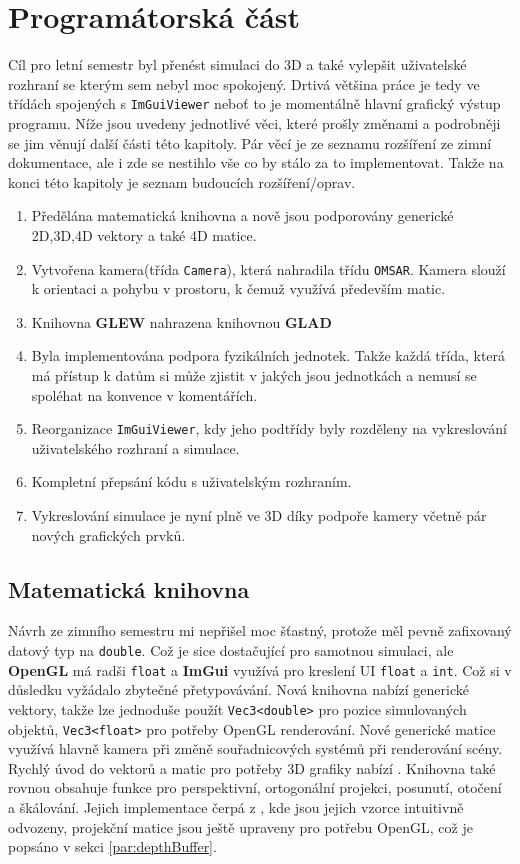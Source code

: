 
\chapter{Programátorská část}

Cíl pro letní semestr byl přenést simulaci do 3D a také vylepšit uživatelské rozhraní se kterým sem nebyl moc spokojený. Drtivá většina práce je tedy ve třídách spojených s \texttt{ImGuiViewer} neboť to je momentálně hlavní grafický výstup programu.
Níže jsou uvedeny jednotlivé věci, které prošly změnami a podrobněji se jim věnují další části této kapitoly. Pár věcí je ze seznamu rozšíření ze zimní dokumentace, ale i zde se nestihlo vše co by stálo za to implementovat. Takže na konci této kapitoly je seznam budoucích rozšíření/oprav.

\begin{enumerate}
	\item Předělána matematická knihovna a nově jsou podporovány generické 2D,3D,4D vektory a také 4D matice.
	\item Vytvořena kamera(třída \texttt{Camera}), která nahradila třídu \texttt{OMSAR}. Kamera slouží k orientaci a pohybu v prostoru, k čemuž využívá především matic.
	\item Knihovna \textbf{GLEW} nahrazena knihovnou \textbf{GLAD}
	\item Byla implementována podpora fyzikálních jednotek. Takže každá třída, která má přístup k datům si může zjistit v jakých jsou jednotkách a nemusí se spoléhat na konvence v komentářích.
	\item Reorganizace \texttt{ImGuiViewer}, kdy jeho podtřídy byly rozděleny na vykreslování uživatelského rozhraní a simulace.
	\item Kompletní přepsání kódu s uživatelským rozhraním.
	\item Vykreslování simulace je nyní plně ve 3D díky podpoře kamery včetně pár nových grafických prvků.
\end{enumerate}

\section{Matematická knihovna}
Návrh ze zimního semestru mi nepřišel moc šťastný, protože měl pevně zafixovaný datový typ na \texttt{double}. Což je sice dostačující pro samotnou simulaci, ale \textbf{OpenGL} má radši \texttt{float} a \textbf{ImGui} využívá pro kreslení UI \texttt{float} a \texttt{int}. Což si v důsledku vyžádalo zbytečné přetypovávání. Nová knihovna nabízí generické vektory, takže lze jednoduše použít \texttt{Vec3<double>} pro pozice simulovaných objektů, \texttt{Vec3<float>} pro potřeby OpenGL renderování. Nové generické matice využívá hlavně kamera při změně souřadnicových systémů při renderování scény.
Rychlý úvod do vektorů a matic pro potřeby 3D grafiky nabízí \cite{ostatniMatice}. Knihovna také rovnou obsahuje funkce pro perspektivní, ortogonální projekci, posunutí, otočení a škálování. Jejich implementace čerpá z \cite{projMatice,rotMatice,ostatniMatice}, kde jsou jejich vzorce intuitivně odvozeny, projekční matice jsou ještě upraveny pro potřebu OpenGL, což je popsáno v sekci \ref{par:depthBuffer}.


